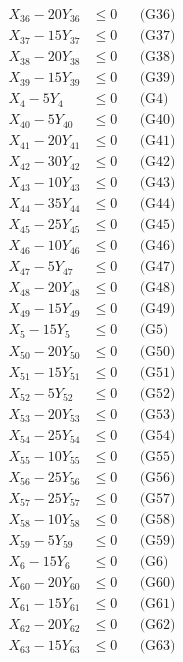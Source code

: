 \documentclass[a4paper,10pt]{article}
\begin{document}
{\begin{align}
X_{36} - 20Y_{36} &\leq 0 && \text{(G36)} \\
X_{37} - 15Y_{37} &\leq 0 && \text{(G37)} \\
X_{38} - 20Y_{38} &\leq 0 && \text{(G38)} \\
X_{39} - 15Y_{39} &\leq 0 && \text{(G39)} \\
X_{4} - 5Y_{4} &\leq 0 && \text{(G4)} \\
X_{40} - 5Y_{40} &\leq 0 && \text{(G40)} \\
X_{41} - 20Y_{41} &\leq 0 && \text{(G41)} \\
X_{42} - 30Y_{42} &\leq 0 && \text{(G42)} \\
X_{43} - 10Y_{43} &\leq 0 && \text{(G43)} \\
X_{44} - 35Y_{44} &\leq 0 && \text{(G44)} \\
\allowbreak
X_{45} - 25Y_{45} &\leq 0 && \text{(G45)} \\
X_{46} - 10Y_{46} &\leq 0 && \text{(G46)} \\
X_{47} - 5Y_{47} &\leq 0 && \text{(G47)} \\
X_{48} - 20Y_{48} &\leq 0 && \text{(G48)} \\
X_{49} - 15Y_{49} &\leq 0 && \text{(G49)} \\
X_{5} - 15Y_{5} &\leq 0 && \text{(G5)} \\
X_{50} - 20Y_{50} &\leq 0 && \text{(G50)} \\
X_{51} - 15Y_{51} &\leq 0 && \text{(G51)} \\
X_{52} - 5Y_{52} &\leq 0 && \text{(G52)} \\
X_{53} - 20Y_{53} &\leq 0 && \text{(G53)} \\
X_{54} - 25Y_{54} &\leq 0 && \text{(G54)} \\
X_{55} - 10Y_{55} &\leq 0 && \text{(G55)} \\
X_{56} - 25Y_{56} &\leq 0 && \text{(G56)} \\
X_{57} - 25Y_{57} &\leq 0 && \text{(G57)} \\
X_{58} - 10Y_{58} &\leq 0 && \text{(G58)} \\
X_{59} - 5Y_{59} &\leq 0 && \text{(G59)} \\
X_{6} - 15Y_{6} &\leq 0 && \text{(G6)} \\
X_{60} - 20Y_{60} &\leq 0 && \text{(G60)} \\
X_{61} - 15Y_{61} &\leq 0 && \text{(G61)} \\
X_{62} - 20Y_{62} &\leq 0 && \text{(G62)} \\
\allowbreak
X_{63} - 15Y_{63} &\leq 0 && \text{(G63)} \\

\end{align}}
\end{document}
